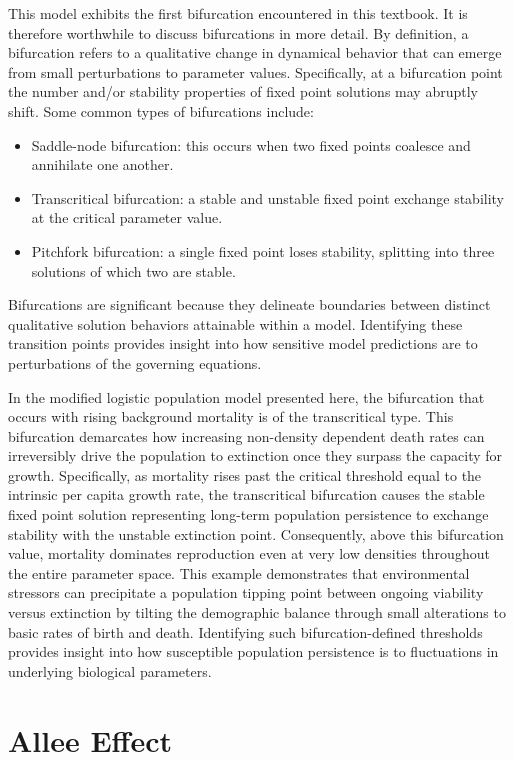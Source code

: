 This model exhibits the first bifurcation encountered in this textbook. It is therefore worthwhile to discuss bifurcations in more detail. By definition, a bifurcation refers to a qualitative change in dynamical behavior that can emerge from small perturbations to parameter values. Specifically, at a bifurcation point the number and/or stability properties of fixed point solutions may abruptly shift. Some common types of bifurcations include:
\begin{itemize}
\item Saddle-node bifurcation: this occurs when two fixed points coalesce and annihilate one another.
\item Transcritical bifurcation: a stable and unstable fixed point exchange stability at the critical parameter value.
\item Pitchfork bifurcation: a single fixed point loses stability, splitting into three solutions of which two are stable.
\end{itemize}
Bifurcations are significant because they delineate boundaries between distinct qualitative solution behaviors attainable within a model. Identifying these transition points provides insight into how sensitive model predictions are to perturbations of the governing equations.

In the modified logistic population model presented here, the bifurcation that occurs with rising background mortality is of the transcritical type. This bifurcation demarcates how increasing non-density dependent death rates can irreversibly drive the population to extinction once they surpass the capacity for growth. Specifically, as mortality rises past the critical threshold equal to the intrinsic per capita growth rate, the transcritical bifurcation causes the stable fixed point solution representing long-term population persistence to exchange stability with the unstable extinction point. Consequently, above this bifurcation value, mortality dominates reproduction even at very low densities throughout the entire parameter space. This example demonstrates that environmental stressors can precipitate a population tipping point between ongoing viability versus extinction by tilting the demographic balance through small alterations to basic rates of birth and death. Identifying such bifurcation-defined thresholds provides insight into how susceptible population persistence is to fluctuations in underlying biological parameters.


\section{Allee Effect}

